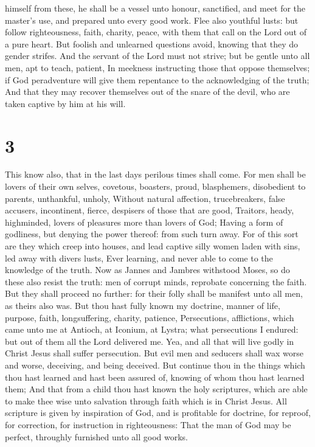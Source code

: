himself from these, he shall be a vessel unto honour, sanctified, and
meet for the master's use, and prepared unto every good work.
 Flee also youthful lusts: but follow righteousness, faith,
charity, peace, with them that call on the Lord out of a pure heart.
 But foolish and unlearned questions avoid, knowing that
they do gender strifes.  And the servant of the Lord must
not strive; but be gentle unto all men, apt to teach, patient,
 In meekness instructing those that oppose themselves; if
God peradventure will give them repentance to the acknowledging of the
truth;  And that they may recover themselves out of the
snare of the devil, who are taken captive by him at his will.

\hypertarget{section-2}{%
\section{3}\label{section-2}}

 This know also, that in the last days perilous times shall
come.  For men shall be lovers of their own selves,
covetous, boasters, proud, blasphemers, disobedient to parents,
unthankful, unholy,  Without natural affection,
trucebreakers, false accusers, incontinent, fierce, despisers of those
that are good,  Traitors, heady, highminded, lovers of
pleasures more than lovers of God;  Having a form of
godliness, but denying the power thereof: from such turn away.
 For of this sort are they which creep into houses, and lead
captive silly women laden with sins, led away with divers lusts,
 Ever learning, and never able to come to the knowledge of
the truth.  Now as Jannes and Jambres withstood Moses, so do
these also resist the truth: men of corrupt minds, reprobate concerning
the faith.  But they shall proceed no further: for their
folly shall be manifest unto all men, as theirs also was. 
But thou hast fully known my doctrine, manner of life, purpose, faith,
longsuffering, charity, patience,  Persecutions,
afflictions, which came unto me at Antioch, at Iconium, at Lystra; what
persecutions I endured: but out of them all the Lord delivered me.
 Yea, and all that will live godly in Christ Jesus shall
suffer persecution.  But evil men and seducers shall wax
worse and worse, deceiving, and being deceived.  But
continue thou in the things which thou hast learned and hast been
assured of, knowing of whom thou hast learned them;  And
that from a child thou hast known the holy scriptures, which are able to
make thee wise unto salvation through faith which is in Christ Jesus.
 All scripture is given by inspiration of God, and is
profitable for doctrine, for reproof, for correction, for instruction in
righteousness:  That the man of God may be perfect,
throughly furnished unto all good works.

